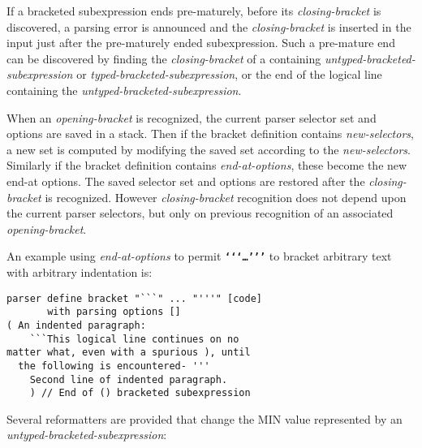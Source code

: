 \documentclass[12pt]{article}
\newcommand{\TT}[1]{{\tt \bfseries #1}}
\newenvironment{indpar}[1][0.3in]%
	{\begin{list}{}%
		     {\setlength{\itemsep}{0in}%
		      \setlength{\topsep}{0in}%
		      \setlength{\parsep}{1ex}%
		      \setlength{\labelwidth}{#1}%
		      \setlength{\leftmargin}{#1}%
		      \addtolength{\leftmargin}{\labelsep}}%
	 \item}%
	{\end{list}}
\begin{document}
If a bracketed subexpression ends pre-maturely, before
its {\em closing-bracket} is discovered, a parsing error is
announced and the {\em closing-bracket} is inserted in the input
just after the pre-maturely ended subexpression.  Such a pre-mature end can be
discovered by finding the {\em closing-bracket} of a containing
{\em untyped-bracketed-subexpression} or {\em typed-bracketed-subexpression},
or the end of the logical line
containing the {\em untyped-bracketed-subexpression}.

When an {\em opening-bracket} is recognized, the current parser
selector set and options are saved in a stack.  Then if the
bracket definition contains {\em new-selectors},
a new set is computed by modifying the saved set
according to the {\em new-selectors}.
Similarly if the bracket definition contains {\em end-at-options},
these become the new end-at options.
The saved selector set and options are restored after the {\em closing-bracket}
is recognized.  However {\em closing-bracket}
recognition does not depend
upon the current parser selectors, but only on previous recognition
of an associated {\em opening-bracket}.

An example using {\em end-at-options} to permit
\TT{`{}`{}`\ldots'{}'{}'}
to bracket arbitrary text with arbitrary indentation is:
\begin{indpar}\begin{verbatim}
parser define bracket "```" ... "'''" [code]
       with parsing options []
( An indented paragraph:
    ```This logical line continues on no
matter what, even with a spurious ), until
  the following is encountered- '''
    Second line of indented paragraph.
    ) // End of () bracketed subexpression
\end{verbatim}\end{indpar}

Several reformatters are provided that change the MIN value
represented by an {\em untyped-bracketed-subexpression}:
\end{document}
